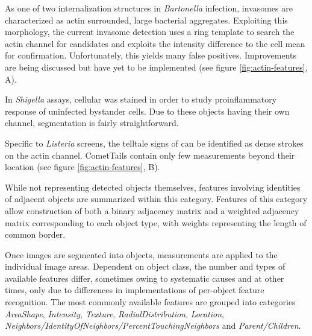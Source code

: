 \begin{description}[leftmargin=0.5cm]
\item[Invasomes:] As one of two internalization structures in \textit{Bartonella} infection, invasomes are characterized as actin surrounded, large bacterial aggregates. Exploiting this morphology, the current invasome detection uses a ring template to search the actin channel for candidates and exploits the intensity difference to the cell mean for confirmation. Unfortunately, this yields many false positives. Improvements are being discussed but have yet to be implemented (see figure \ref{fig:actin-features}, A).
\item[IL8:] In \textit{Shigella} assays, cellular  was stained in order to study proinflammatory response of uninfected bystander cells. Due to these objects having their own channel, segmentation is fairly straightforward.
\item[CometTails:] Specific to \textit{Listeria} screens, the telltale signs of  can be identified as dense strokes on the actin channel. CometTails contain only few measurements beyond their location (see figure \ref{fig:actin-features}, B).
\item[Neighbors:] While not representing detected objects themselves, features involving identities of adjacent objects are summarized within this category.  Features of this category allow construction of both a binary adjacency matrix and a weighted adjacency matrix corresponding to each object type, with weights representing the length of common border.
\end{description}

Once images are segmented into objects, measurements are applied to the individual image areas. Dependent on object class, the number and types of available features differ, sometimes owing to systematic causes and at other times, only due to differences in implementations of per-object feature recognition. The most commonly available features are grouped into categories \textit{AreaShape}, \textit{Intensity}, \textit{Texture}, \textit{RadialDistribution}, \textit{Location}, \textit{Neighbors\slash IdentityOfNeighbors\slash Per\-centTouchingNeighbors} and \textit{Parent\slash Children}.

